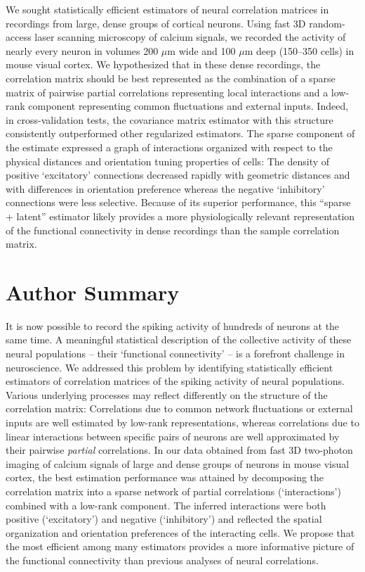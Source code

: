 \documentclass[10pt]{article}
\newcommand{\sq}[1]{\lq#1\rq}
\begin{document}
We sought statistically efficient estimators of neural correlation matrices in recordings from large, dense groups of cortical neurons.  Using fast 3D random-access laser scanning microscopy of calcium signals, we recorded the activity of nearly every neuron in volumes 200 $\mu$m wide and 100 $\mu$m deep (150--350 cells) in mouse visual cortex.  We hypothesized that in these dense recordings, the correlation matrix should be best represented as the combination of a sparse matrix of pairwise partial correlations representing local interactions and a low-rank component representing common fluctuations and external inputs.  Indeed, in cross-validation tests, the covariance matrix estimator with this structure consistently outperformed other regularized estimators. The sparse component of the estimate expressed a graph of interactions organized with respect to the physical distances and orientation tuning properties of cells: The density of positive \sq{excitatory} connections decreased rapidly with geometric distances and with differences in orientation preference whereas the negative \sq{inhibitory} connections were less selective.  Because of its superior performance, this ``sparse + latent'' estimator likely provides a more physiologically relevant representation of the functional connectivity in dense recordings than the sample correlation matrix.


\section*{Author Summary}

It is now possible to record the spiking activity of hundreds of neurons at the same time.  A meaningful statistical description of the collective activity of these neural populations -- their \sq{functional connectivity} -- is a forefront challenge in neuroscience.  We addressed this problem by identifying statistically efficient estimators of correlation matrices of the spiking activity of neural populations.  Various underlying processes may reflect differently on the structure of the correlation matrix:  Correlations due to common network fluctuations or external inputs are well estimated by low-rank representations, whereas correlations due to linear interactions between specific pairs of neurons are well approximated by their pairwise \emph{partial} correlations.  In our data obtained from fast 3D two-photon imaging of calcium signals of large and dense groups of neurons in mouse visual cortex, the best estimation performance was attained by decomposing the correlation matrix into a sparse network of partial correlations (\sq{interactions}) combined with a low-rank component. The inferred interactions were both positive (\sq{excitatory}) and negative (\sq{inhibitory}) and reflected the spatial organization and orientation preferences of the interacting cells.  We propose that  the most efficient among many estimators provides a more informative picture of the functional connectivity than previous analyses of neural correlations.
\end{document}
